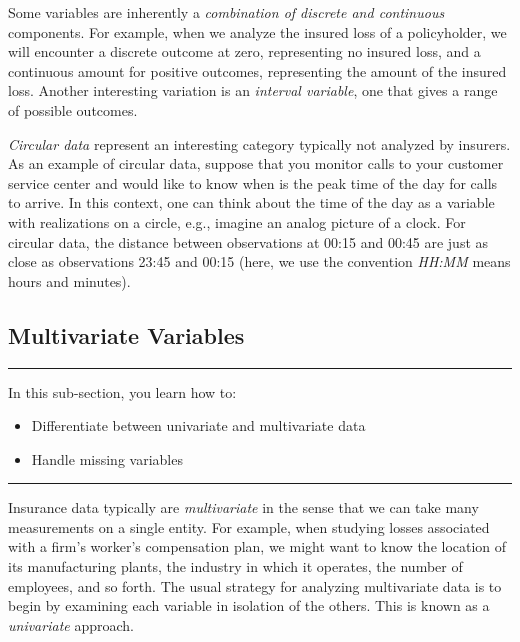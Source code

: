 \documentclass[]{book}
\providecommand{\tightlist}{%
  \setlength{\itemsep}{0pt}\setlength{\parskip}{0pt}}
\theoremstyle{definition}
\theoremstyle{definition}
\theoremstyle{definition}
\theoremstyle{remark}
\begin{document}
Some variables are inherently a \emph{combination of discrete and
continuous} components. For example, when we analyze the insured loss of
a policyholder, we will encounter a discrete outcome at zero,
representing no insured loss, and a continuous amount for positive
outcomes, representing the amount of the insured loss. Another
interesting variation is an \emph{interval variable}, one that gives a
range of possible outcomes.

\emph{Circular data} represent an interesting category typically not
analyzed by insurers. As an example of circular data, suppose that you
monitor calls to your customer service center and would like to know
when is the peak time of the day for calls to arrive. In this context,
one can think about the time of the day as a variable with realizations
on a circle, e.g., imagine an analog picture of a clock. For circular
data, the distance between observations at 00:15 and 00:45 are just as
close as observations 23:45 and 00:15 (here, we use the convention
\emph{HH:MM} means hours and minutes).

\subsection{Multivariate Variables}\label{multivariate-variables}

\begin{center}\rule{0.5\linewidth}{\linethickness}\end{center}

In this sub-section, you learn how to:

\begin{itemize}
\tightlist
\item
  Differentiate between univariate and multivariate data
\item
  Handle missing variables
\end{itemize}

\begin{center}\rule{0.5\linewidth}{\linethickness}\end{center}

Insurance data typically are \emph{multivariate} in the sense that we
can take many measurements on a single entity. For example, when
studying losses associated with a firm's worker's compensation plan, we
might want to know the location of its manufacturing plants, the
industry in which it operates, the number of employees, and so forth.
The usual strategy for analyzing multivariate data is to begin by
examining each variable in isolation of the others. This is known as a
\emph{univariate} approach.
\end{document}
